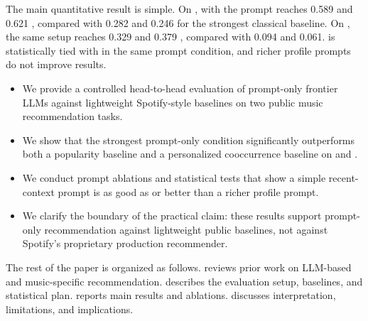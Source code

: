 The main quantitative result is simple. On \lastfm, \gptfourone with the \minimalprompt prompt reaches 0.589 \mrr and 0.621 \ndcg, compared with 0.282 and 0.246 for the strongest classical baseline. On \mpd, the same setup reaches 0.329 \mrr and 0.379 \ndcg, compared with 0.094 and 0.061. \claudesonnet is statistically tied with \gptfourone in the same prompt condition, and richer profile prompts do not improve results.

\begin{itemize}[leftmargin=*,itemsep=0pt,topsep=0pt]
    \item We provide a controlled head-to-head evaluation of prompt-only frontier LLMs against lightweight Spotify-style baselines on two public music recommendation tasks.
    \item We show that the strongest prompt-only condition significantly outperforms both a popularity baseline and a personalized cooccurrence baseline on \lastfm and \mpd.
    \item We conduct prompt ablations and statistical tests that show a simple recent-context prompt is as good as or better than a richer profile prompt.
    \item We clarify the boundary of the practical claim: these results support prompt-only recommendation against lightweight public baselines, not against Spotify's proprietary production recommender.
\end{itemize}

The rest of the paper is organized as follows.  reviews prior work on LLM-based and music-specific recommendation.  describes the evaluation setup, baselines, and statistical plan.  reports main results and ablations.  discusses interpretation, limitations, and implications.
